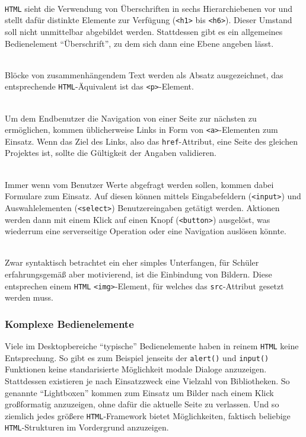 \begin{description}[noitemsep]
\item[Überschriften] \hfill \\
  \texttt{HTML} sieht die Verwendung von Überschriften in sechs Hierarchiebenen vor und stellt dafür distinkte Elemente zur Verfügung (\texttt{<h1>} bis \texttt{<h6>}). Dieser Umstand soll nicht unmittelbar abgebildet werden. Stattdessen gibt es ein allgemeines Bedienelement ``Überschrift'', zu dem sich dann eine Ebene angeben lässt.
\item[Absätze] \hfill \\
  Blöcke von zusammenhängendem Text werden als Absatz ausgezeichnet, das entsprechende \texttt{HTML}-Äquivalent ist das \texttt{<p>}-Element.
\item[Links] \hfill \\
  Um dem Endbenutzer die Navigation von einer Seite zur nächsten zu ermöglichen, kommen üblicherweise Links in Form von \texttt{<a>}-Elementen zum Einsatz. Wenn das Ziel des Links, also das \texttt{href}-Attribut, eine Seite des gleichen Projektes ist, sollte \idename{} die Gültigkeit der Angaben validieren.
\item[Formulare, Eingaben \& Knöpfe] \hfill \\
  Immer wenn vom Benutzer Werte abgefragt werden sollen, kommen dabei Formulare zum Einsatz. Auf diesen können mittels Eingabefeldern (\texttt{<input>}) und Auswahlelementen (\texttt{<select>}) Benutzereingaben getätigt werden. Aktionen werden dann mit einem Klick auf einen Knopf (\texttt{<button>}) ausgelöst, was wiederrum eine serverseitige Operation oder eine Navigation auslösen könnte.
\item[Bilder] \hfill \\
  Zwar syntaktisch betrachtet ein eher simples Unterfangen, für Schüler erfahrungsgemäß aber motivierend, ist die Einbindung von Bildern. Diese entsprechen einem \texttt{HTML} \texttt{<img>}-Element, für welches das \texttt{src}-Attribut gesetzt werden muss.
\end{description}


\subsubsection{Komplexe Bedienelemente}
\label{sec:complex-ui-elements}

Viele im Desktopbereiche "`typische"' Bedienelemente haben in reinem \texttt{HTML} keine Entsprechung. So gibt es zum Beispiel jenseits der \texttt{alert()} und \texttt{input()} Funktionen keine standarisierte Möglichkeit modale Dialoge anzuzeigen. Stattdessen existieren je nach Einsatzzweck eine Vielzahl von Bibliotheken. So genannte "`Lightboxen"' kommen zum Einsatz um Bilder nach einem Klick großformatig anzuzeigen, ohne dafür die aktuelle Seite zu verlassen. Und so ziemlich jedes größere \texttt{HTML}-Framework bietet Möglichkeiten, faktisch beliebige \texttt{HTML}-Strukturen im Vordergrund anzuzeigen.

